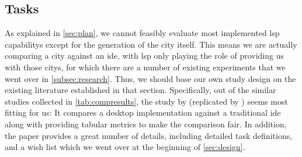 \documentclass[../thesis]{subfiles}
\begin{document}
\subsection{Tasks}\label{subsec:tasks}
As explained in \cref{sec:plan}, we cannot feasibly evaluate most implemented \gls{lsp} \glspl{capability} except for the generation of the \gls{city} itself.
This means we are actually comparing a \gls{city} against an \gls{ide}, with \gls{lsp} only playing the role of providing us with those \glspl{city}, for which there are a number of existing experiments that we went over in \cref{subsec:research}.
Thus, we should base our own study design on the existing literature established in that section.
Specifically, out of the similar studies collected in \cref{tab:compresults}, the study by \textcites{wettel2011} (replicated by \textcite{romano2019}) seems most fitting for us:
It compares a desktop  implementation against a traditional \gls{ide} along with providing tabular metrics to make the comparison fair.
In addition, the paper provides a great number of details, including detailed task definitions, and a wish list which we went over at the beginning of \cref{sec:design}.
\end{document}
